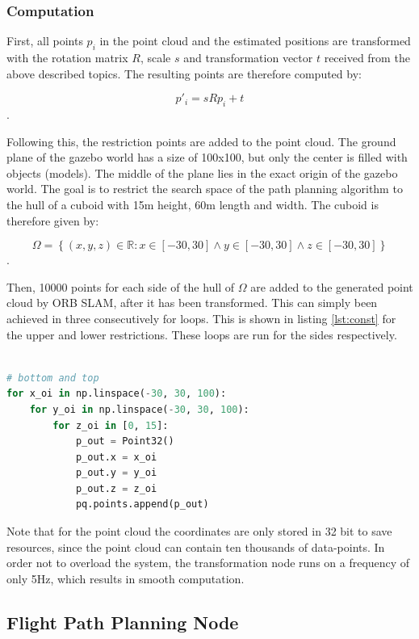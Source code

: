 	\subsubsection{Computation}\label{cub}
	
	First, all points $p_i$ in the point cloud and the estimated positions are transformed with the rotation matrix $R$, scale $s$ and transformation vector $t$ received 
	from the above described topics. The resulting points are therefore computed by: 
	
	$$p'_i = sRp_i + t$$.
	
	Following this, the restriction points are added to the point cloud.
	The ground plane of the gazebo world has a size of 100x100, but only the center is filled with objects (models). The middle of the plane 
	lies in the exact origin of the gazebo world. The goal is to restrict the search space of the path planning algorithm to the hull of a cuboid with 15m
	height, 60m length and width. The cuboid is therefore given by: 
	
	$$\Omega = \left\{(x, y, z) \in \mathbb{R} : x \in \left[-30, 30\right] \land y \in \left[-30, 30\right] \land z \in \left[-30, 30\right] \right\}$$.
	
	Then, 10000 points for each side of the hull of $\Omega$ are added to the generated point cloud by ORB SLAM, after it has been transformed. This can simply been achieved 
	in three consecutively for loops. This is shown in listing \ref{lst:const} for the upper and lower restrictions. These loops are run for the sides respectively. 
	
	\begin{lstlisting}[language=python, caption= Adding upper and lower restrictions to point cloud. , label=lst:const]
	
# bottom and top 
for x_oi in np.linspace(-30, 30, 100): 
	for y_oi in np.linspace(-30, 30, 100): 
		for z_oi in [0, 15]: 
			p_out = Point32()
			p_out.x = x_oi
			p_out.y = y_oi
			p_out.z = z_oi
			pq.points.append(p_out)

	\end{lstlisting}

	Note that for the point cloud the coordinates are only stored in 32 bit to save resources, since the point cloud can contain ten thousands of data-points. In order not 
	to overload the system, the transformation node runs on a frequency of only 5Hz, which results in smooth computation. 
	
	\subsection{Flight Path Planning Node} \label{path}
	
